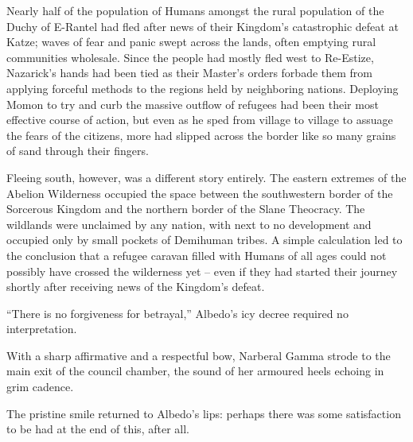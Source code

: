  

Nearly half of the population of Humans amongst the rural population of the Duchy of E-Rantel had fled after news of their Kingdom’s catastrophic defeat at Katze; waves of fear and panic swept across the lands, often emptying rural communities wholesale. Since the people had mostly fled west to Re-Estize, Nazarick’s hands had been tied as their Master’s orders forbade them from applying forceful methods to the regions held by neighboring nations. Deploying Momon to try and curb the massive outflow of refugees had been their most effective course of action, but even as he sped from village to village to assuage the fears of the citizens, more had slipped across the border like so many grains of sand through their fingers.

 

Fleeing south, however, was a different story entirely. The eastern extremes of the Abelion Wilderness occupied the space between the southwestern border of the Sorcerous Kingdom and the northern border of the Slane Theocracy. The wildlands were unclaimed by any nation, with next to no development and occupied only by small pockets of Demihuman tribes. A simple calculation led to the conclusion that a refugee caravan filled with Humans of all ages could not possibly have crossed the wilderness yet – even if they had started their journey shortly after receiving news of the Kingdom’s defeat.

 

“There is no forgiveness for betrayal,” Albedo’s icy decree required no interpretation.

 

With a sharp affirmative and a respectful bow, Narberal Gamma strode to the main exit of the council chamber, the sound of her armoured heels echoing in grim cadence.

 

The pristine smile returned to Albedo’s lips: perhaps there was some satisfaction to be had at the end of this, after all.